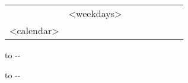 \begin{tabularx}{\textwidth}{@{}l!{\vrule width \myLenLineThicknessThick}*{7}{@{}X@{}|}}
& <weekdays> \\ 
<calendar>
\end{tabularx}
\medskip

\parbox{\myLenTwoCol}{
    \vbox to \dimexpr\textheight-\pagetotal-\myHBL{}%
}
\hspace{.5em}
\parbox{\dimexpr.5\linewidth-.5em}{
    \vbox to \dimexpr\textheight-\pagetotal-\myHBL{}%
}